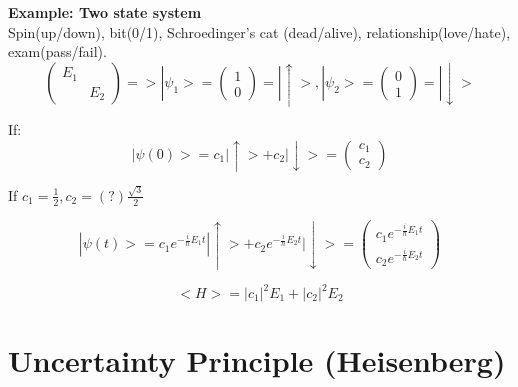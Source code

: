 \documentclass[12pt,a4paper]{article}
\begin{document}
\textbf{Example: Two state system}\\

Spin(up/down), bit(0/1), Schroedinger's cat (dead/alive), relationship(love/hate), exam(pass/fail).\\

\[
  \begin{pmatrix}
  E_1 &    \\
      & E_2
  \end{pmatrix}
  => | \psi _1 > =
  \begin{pmatrix}
  1 \\
  0
  \end{pmatrix}
  = | \uparrow >, | \psi _2 > =
  \begin{pmatrix}
  0 \\
  1
  \end{pmatrix}
  = | \downarrow >
\]

If:
\[
| \psi (0) > = c_1 | \uparrow > + c_2 | \downarrow > = 
 \begin{pmatrix}
 c_1 \\
 c_2
 \end{pmatrix}
\]

If $c_1= \frac{1}{2}, c_2=(?) \frac{\sqrt{3}}{2}$

\[
| \psi (t) > = c_1 e^{- \frac{i}{\hbar} E_1 t } | \uparrow > + c_2 e^{- \frac{i}{\hbar} E_2 t } | \downarrow > =
 \begin{pmatrix}
   c_1 e^{- \frac{i}{\hbar} E_1 t } \\
   c_2 e^{- \frac{i}{\hbar} E_2 t }
 \end{pmatrix}
\]

\[
<H> = |c_1|^2 E_1 + |c_2|^2 E_2
\]

\pagebreak

\section{Uncertainty Principle (Heisenberg)}
\end{document}
